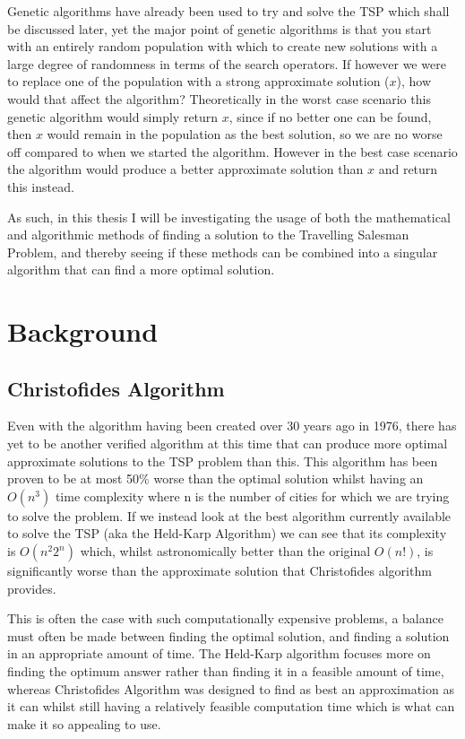 \documentclass[11pt,a4paper,titlepage]{article}
\begin{document}
Genetic algorithms have already been used to try and solve the TSP which shall be discussed later, yet the major point of genetic algorithms is that you start with an entirely random population with which to create new solutions with a large degree of randomness in terms of the search operators. If however we were to replace one of the population with a strong approximate solution ($x$), how would that affect the algorithm? Theoretically in the worst case scenario this genetic algorithm would simply return $x$, since if no better one can be found, then $x$ would remain in the population as the best solution, so we are no worse off compared to when we started the algorithm. However in the best case scenario the algorithm would produce a better approximate solution than $x$ and return this instead.

As such, in this thesis I will be investigating the usage of both the mathematical and algorithmic methods of finding a solution to the Travelling Salesman Problem, and thereby seeing if these methods can be combined into a singular algorithm that can find a more optimal solution.

\section{Background}

\subsection{Christofides Algorithm}
Even with the algorithm having been created over 30 years ago in 1976, there has yet to be another verified algorithm at this time that can produce more optimal approximate solutions to the TSP problem than this. This algorithm has been proven to be at most 50\% worse than the optimal solution whilst having an $O(n^3)$ time complexity where n is the number of cities for which we are trying to solve the problem. \cite{ChrAlg} If we instead look at the best algorithm currently available to solve the TSP (aka the Held-Karp Algorithm) we can see that its complexity is $O(n^2 2^n)$ \cite{HeldKarpAlg} which, whilst astronomically better than the original $O(n!)$, is significantly worse than the approximate solution that Christofides algorithm provides.

This is often the case with such computationally expensive problems, a balance must often be made between finding the optimal solution, and finding a solution in an appropriate amount of time. The Held-Karp algorithm focuses more on finding the optimum answer rather than finding it in a feasible amount of time, whereas Christofides Algorithm was designed to find as best an approximation as it can whilst still having a relatively feasible computation time which is what can make it so appealing to use. 
\end{document}

